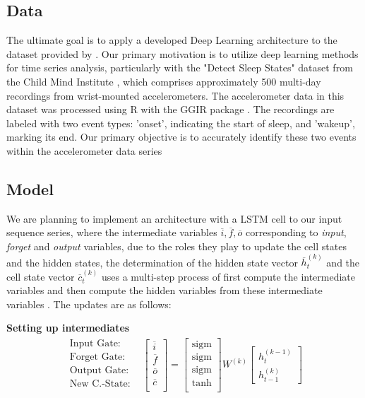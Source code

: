 \documentclass{article}
\begin{document}
\subsection{Data}

The ultimate goal is to apply a developed Deep Learning architecture to the dataset provided by \cite{child-mind-institute-detect-sleep-states}. Our primary motivation is to utilize deep learning methods for time series analysis, particularly with the "Detect Sleep States" dataset from the Child Mind Institute \cite{child-mind-institute-detect-sleep-states}, which comprises approximately 500 multi-day recordings from wrist-mounted accelerometers. The accelerometer data in this dataset was processed using R with the GGIR package \cite{Migueles2019GGIR}. The recordings are labeled with two event types: 'onset', indicating the start of sleep, and 'wakeup', marking its end. Our primary objective is to accurately identify these two events within the accelerometer data series
    
\subsection{Model}

We are planning to implement an architecture with a LSTM cell to our input sequence series, where the intermediate variables \( \overline{i}, \overline{f}, \overline{o}\) corresponding to \textit{input}, \textit{forget} and \textit{output} variables, due to the roles they play to update the cell states and the hidden states, the determination of the hidden state vector \(\overline{h}^{(k)}_{t}\) and the cell state vector \(\overline{c}^{(k)}_{t}\) uses a multi-step process of first compute the intermediate variables and then compute the hidden variables from these intermediate variables \cite{Aggarwal2018}. The updates are as follows:

\textbf{Setting up intermediates}
\begin{align*}
\begin{matrix}
\text{Input Gate:} \\
\text{Forget Gate:} \\
\text{Output Gate:} \\
\text{New C.-State:} \\
\end{matrix} &\begin{bmatrix}
\overline{i} \\ 
\overline{f} \\
\overline{o} \\
\overline{c} \\
\end{bmatrix} =
\begin{bmatrix}
\text{sigm} \\
\text{sigm} \\
\text{sigm} \\
\tanh \\
\end{bmatrix} W^{(k)}
\begin{bmatrix}
h_{t}^{(k-1)} \\
h_{t-1}^{(k)}
\end{bmatrix}
\end{align*}
\end{document}
